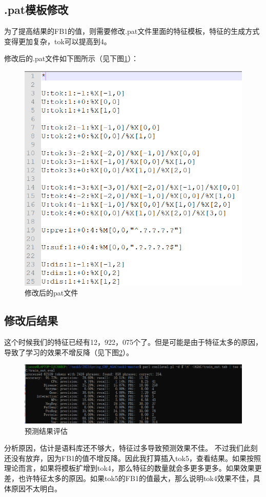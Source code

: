 \documentclass[12pt]{article}
\begin{document}
\subsection{.pat模板修改}
为了提高结果的FB1的值，则需要修改.pat文件里面的特征模板，特征的生成方式变得更加复杂，tok可以提高到4。\par
修改后的.pat文件如下图所示（见下图\ref{asaddd}）：
\begin{figure}[H]
  \centering
  \includegraphics[scale=0.5]{./picture/patchange.png} %
  \caption{修改后的pat文件} %
  \label{asaddd} %
\end{figure}
\subsection{修改后结果}
这个时候我们的特征已经有12，922，075个了。但是可能是由于特征太多的原因，导致了学习的效果不增反降（见下图\ref{sadasaa}）。
\begin{figure}[H]
  \centering
  \includegraphics[scale=0.5]{./picture/result2.png} %
  \caption{预测结果评估} %
  \label{sadasaa} %
\end{figure}
分析原因，估计是语料库还不够大，特征过多导致预测效果不佳。
不过我们此刻还没有放弃，因为FB1的值不增反降。因此我打算插入tok5，查看结果。如果按照理论而言，如果将模板扩增到tok4，那么特征的数量就会多更多更多。如果效果更差，也许特征太多的原因。如果tok5的FB1的值最大，那么说明tok4效果不佳，具体原因不太明白。\par
\end{document}
